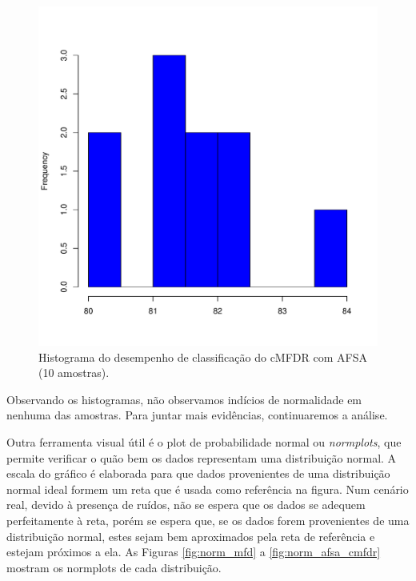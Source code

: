 \documentclass[conference]{IEEEtran}
\begin{document}
\begin{figure}[h]
	\centering
	\includegraphics[width=\linewidth]{img/bluehist_afsa_cmfdr.pdf}
	\caption{Histograma do desempenho de classificação do cMFDR com AFSA (10 amostras).}
	\label{fig:hist_afsa_cmfdr}
\end{figure}

Observando os histogramas, não observamos indícios de normalidade em nenhuma das amostras.
Para juntar mais evidências, continuaremos a análise.

Outra ferramenta visual útil é o plot de probabilidade normal ou \textit{normplots}, que permite verificar o quão bem os dados representam uma distribuição normal.
A escala do gráfico é elaborada para que dados provenientes de uma distribuição normal ideal formem um reta que é usada como referência na figura.
Num cenário real, devido à presença de ruídos, não se espera que os dados se adequem perfeitamente à reta, porém se espera que, se os dados forem provenientes de uma distribuição normal, estes sejam bem aproximados pela reta de referência e estejam próximos a ela.
As Figuras \ref{fig:norm_mfd} a \ref{fig:norm_afsa_cmfdr} mostram os normplots de cada distribuição.
\end{document}
